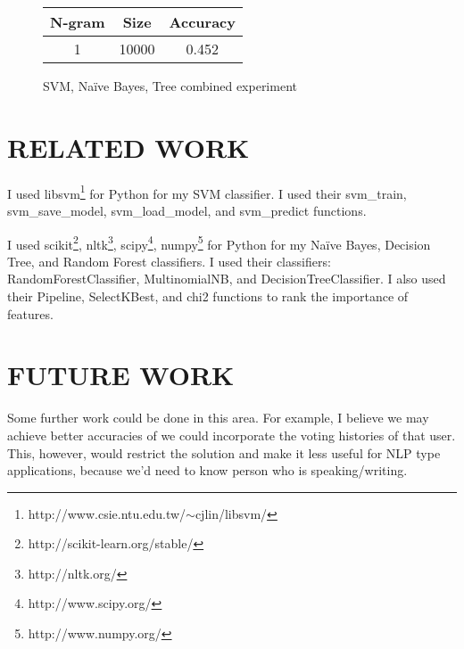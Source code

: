 \documentclass[11pt, onecolumn]{IEEEtran}
\begin{document}
\begin{figure}[H]
	\begin{center}
		\begin{tabular}{ | c | c | c |}
		\hline
		N-gram & Size & Accuracy\\
		\hline \hline
		1 & 10000 & 0.452 \\
		\hline
		\end{tabular}
	\end{center}
\caption{SVM, Na\"{i}ve Bayes, Tree combined experiment}
\label{nbresults}
\end{figure}



\section{RELATED WORK}
I used libsvm\footnote{http://www.csie.ntu.edu.tw/$\sim$cjlin/libsvm/} for Python for my SVM classifier. I used their svm\_train, svm\_save\_model, svm\_load\_model, and svm\_predict functions.

I used scikit\footnote{http://scikit-learn.org/stable/}, nltk\footnote{http://nltk.org/}, scipy\footnote{http://www.scipy.org/}, numpy\footnote{http://www.numpy.org/} for Python for my Na\"{i}ve Bayes, Decision Tree, and Random Forest classifiers. I used their classifiers: RandomForestClassifier, MultinomialNB, and DecisionTreeClassifier. I also used their Pipeline, SelectKBest, and chi2 functions to rank the importance of features.
\section{FUTURE WORK}
Some further work could be done in this area. For example, I believe we may achieve better accuracies of we could incorporate the voting histories of that user. This, however, would restrict the solution and make it less useful for NLP type applications, because we'd need to know person who is speaking/writing.
\end{document}
